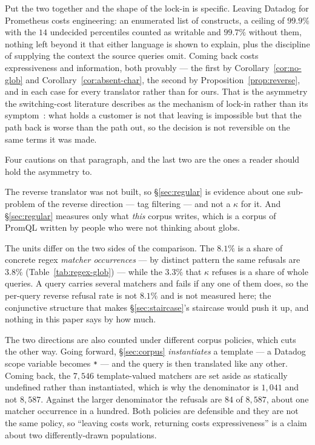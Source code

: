 Put the two together and the shape of the lock-in is specific. Leaving Datadog for
Prometheus costs engineering: an enumerated list of constructs, a ceiling of $99.9\%$
with the $14$ undecided percentiles counted as writable and $99.7\%$ without them,
nothing left beyond it that either language is shown to explain, plus the discipline of
supplying
the context the source queries omit. Coming back costs
expressiveness and information, both provably --- the first by
Corollary~\ref{cor:no-glob} and Corollary~\ref{cor:absent-char}, the second by
Proposition~\ref{prop:reverse}, and in each case for every translator rather than for
ours. That is the asymmetry the switching-cost
literature describes as the mechanism of lock-in rather than its
symptom~\citep{farrell2007,shapiro1999}: what holds a customer is not that leaving is
impossible but that the path back is worse than the path out, so the decision is not
reversible on the same terms it was made.

Four cautions on that paragraph, and the last two are the ones a reader should hold
the asymmetry to.

The reverse translator was not built, so \S\ref{sec:regular} is evidence about one
sub-problem of the reverse direction --- tag filtering --- and not a $\kappa$ for it.
And \S\ref{sec:regular} measures only what \emph{this} corpus writes, which is a corpus
of PromQL written by people who were not thinking about globs.

The units differ on the two sides of the comparison. The $8.1\%$ is a share of concrete
regex \emph{matcher occurrences} --- by distinct pattern the same refusals are $3.8\%$
(Table~\ref{tab:regex-glob}) --- while the $3.3\%$ that $\kappa$ refuses is a share of
whole queries. A
query carries several matchers and fails if any one of them does, so the per-query
reverse refusal rate is not $8.1\%$ and is not measured here; the conjunctive structure
that makes \S\ref{sec:staircase}'s staircase would push it up, and nothing in this
paper says by how much.

The two directions are also counted under different corpus policies, which cuts the
other way. Going forward, \S\ref{sec:corpus} \emph{instantiates} a template --- a
Datadog scope variable becomes \texttt{*} --- and the query is then translated like any
other. Coming back, the $7{,}546$ template-valued matchers are set aside as statically
undefined rather than instantiated, which is why the denominator is $1{,}041$ and not
$8{,}587$. Against the larger denominator the refusals are $84$ of $8{,}587$, about one
matcher occurrence in a hundred. Both policies are
defensible and they are not the same policy, so ``leaving costs work, returning costs
expressiveness'' is a claim about two differently-drawn populations.

